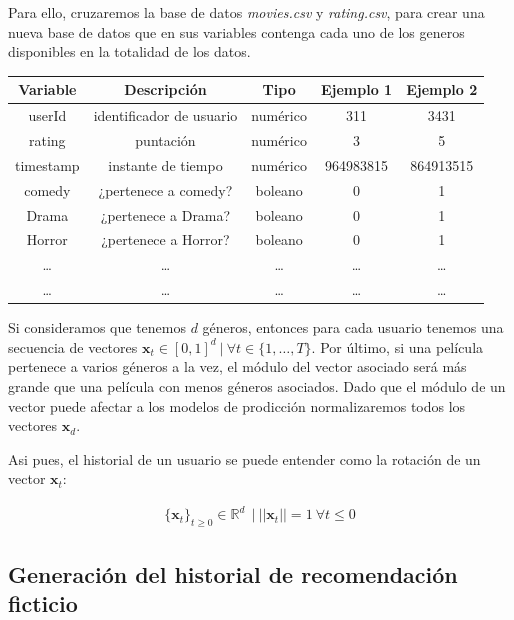 Para ello, cruzaremos la base de datos \emph{movies.csv} y \emph{rating.csv}, para crear una nueva base de datos que en sus variables contenga cada uno de los generos disponibles en la totalidad de los datos. 



\begin{center}
    \begin{tabular}{|c|c|c|c|c|}
    \hline
    \textbf{Variable} & \textbf{Descripción} & \textbf{Tipo} & \textbf{Ejemplo 1} & \textbf{Ejemplo 2} \\ 
    \hline
     userId & identificador de usuario   & numérico & 311 & 3431 \\  
     rating & puntación  & numérico & 3 & 5 \\
    timestamp & instante de tiempo  & numérico & 964983815 & 864913515 \\        
    \hline
     comedy & ¿pertenece a comedy?  & boleano & 0 & 1 \\  
     Drama & ¿pertenece a Drama?  & boleano & 0 & 1 \\  
    Horror & ¿pertenece a Horror?  & boleano & 0 & 1 \\  
    \dots & \dots  & \dots & \dots & \dots  \\  
    \dots & \dots  & \dots & \dots & \dots  \\  
     \hline
    \end{tabular}
\end{center} 


Si consideramos que tenemos $d$ géneros, entonces para cada usuario tenemos una secuencia de vectores $\bm{x}_t \in [0,1]^d \ | \ \forall t \in \{ 1,\dots,T\}$. Por último, si una película pertenece a varios géneros a la vez, el módulo del vector asociado será más grande que una película con menos géneros asociados. Dado que el módulo de un vector puede afectar a los modelos de prodicción normalizaremos todos los vectores $\bm{x}_d$. 

Asi pues, el historial de un usuario se puede entender como la rotación de un vector $\bm{x}_t$:

\begin{gather}
    \{ \bm{x}_t  \}_{t \geq0} \in \mathbb{R}^d \ \ | \ ||\bm{x}_t|| = 1 \ \forall t \leq 0
\end{gather}

\subsection{Generación del historial de recomendación ficticio}


